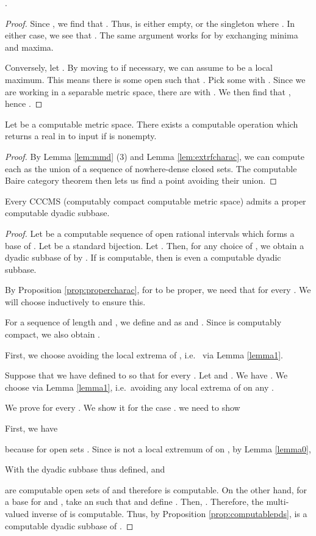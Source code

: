 \documentclass{eptcs-modified}
\begin{document}
\begin{lemma}
\label{lem:extrfcharac}
.
\begin{proof}
Since , we find that . Thus,  is either empty, or the singleton  where . In either case, we see that . The same argument works for  by exchanging minima and maxima.

Conversely, let . By moving to  if necessary, we can assume  to be a local maximum. This means there is some open  such that . Pick some  with . Since we are working in a separable metric space, there are  with . We then find that , hence .
\end{proof}
\end{lemma}


\begin{lemma}\label{lemma1}
  Let  be a computable metric space.
There exists a computable operation  which returns a real in
 to input  if  is nonempty.
\end{lemma}

\begin{proof}
By Lemma \ref{lem:mmd} (3) and Lemma \ref{lem:extrfcharac}, we can compute each  as the union of a sequence of nowhere-dense closed sets. The computable Baire category theorem then lets us find a point avoiding their union.
\end{proof}

\begin{theorem}
\label{theo:dyadicexists}
Every CCCMS (computably compact computable metric space)  admits a proper computable dyadic subbase.
\end{theorem}
\begin{proof}
Let  be a computable sequence of  open rational intervals which forms a base of .   Let  be a standard bijection. Let .
Then, for any choice of , we obtain a dyadic subbase of  by . If  is computable, then  is even a computable dyadic subbase.

By Proposition \ref{prop:propercharac}, for  to be proper, we need that
 for every . We will choose  inductively to ensure this.


For a sequence  of length  and ,
we define  and 
as   and
. Since  is computably compact, we also obtain .

First, we choose  avoiding the local extrema of , i.e.~ via Lemma \ref{lemma1}.

Suppose that we have defined  to  so that
 for every .
Let  and .  We have .
We choose  via Lemma \ref{lemma1}, i.e.~avoiding any local extrema of  on any .

We prove  for every .  We show it for the case .
we need to show

First, we have

because  for open sets .
Since  is not a local extremum of  on , by Lemma \ref{lemma0},


With the dyadic subbase  thus defined,  and

are computable open sets of  and therefore  is computable.
On the other hand,  for a base  for  and , take an  such that  and
define . Then,
.  Therefore, the multi-valued inverse of  is computable.
Thus, by Proposition \ref{prop:computablepds},
 is a computable dyadic subbase of .
\end{proof}
\end{document}
